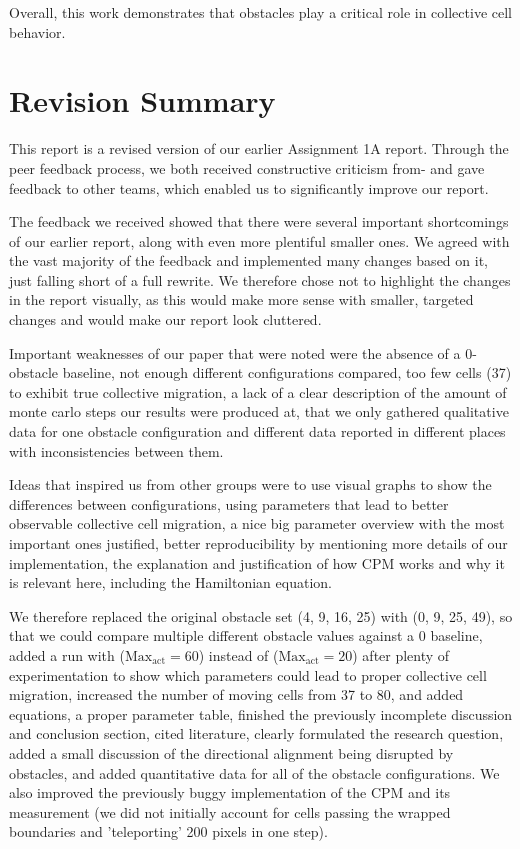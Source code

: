 \documentclass{article}
\begin{document}
Overall, this work demonstrates that obstacles play a critical role in collective cell behavior.

\section{Revision Summary}

This report is a revised version of our earlier Assignment 1A report. Through the peer feedback process, we both received constructive criticism from- and gave feedback to other teams, which enabled us to significantly improve our report.

The feedback we received showed that there were several important shortcomings of our earlier report, along with even more plentiful smaller ones. We agreed with the vast majority of the feedback and implemented many changes based on it, just falling short of a full rewrite. We therefore chose not to highlight the changes in the report visually, as this would make more sense with smaller, targeted changes and would make our report look cluttered.

Important weaknesses of our paper that were noted were the absence of a 0-obstacle baseline, not enough different configurations compared, too few cells (37) to exhibit true collective migration, a lack of a clear description of the amount of monte carlo steps our results were produced at, that we only gathered qualitative data for one obstacle configuration and different data reported in different places with inconsistencies between them.

Ideas that inspired us from other groups were to use visual graphs to show the differences between configurations, using parameters that lead to better observable collective cell migration, a nice big parameter overview with the most important ones justified, better reproducibility by mentioning more details of our implementation, the explanation and justification of how CPM works and why it is relevant here, including the Hamiltonian equation.

We therefore replaced the original obstacle set (4, 9, 16, 25) with (0, 9, 25, 49), so that we could compare multiple different obstacle values against a 0 baseline, added a run with ($\text{Max}_\text{act} = 60$) instead of ($\text{Max}_\text{act} = 20$) after plenty of experimentation to show which parameters could lead to proper collective cell migration, increased the number of moving cells from 37 to 80, and added equations, a proper parameter table, finished the previously incomplete discussion and conclusion section, cited literature, clearly formulated the research question, added a small discussion of the directional alignment being disrupted by obstacles, and added quantitative data for all of the obstacle configurations. We also improved the previously buggy implementation of the CPM and its measurement (we did not initially account for cells passing the wrapped boundaries and 'teleporting' 200 pixels in one step).
\end{document}
